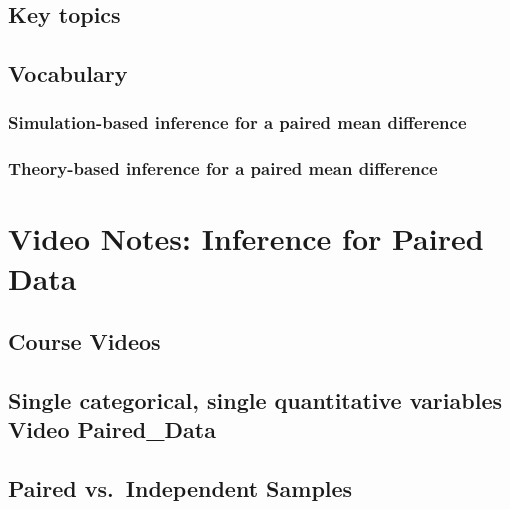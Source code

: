 \documentclass[
]{report}
\begin{document}
\subsection{Key topics}\label{key-topics-10}

\subsection{Vocabulary}\label{vocabulary-8}

\subsubsection*{Simulation-based inference for a paired mean difference}\label{simulation-based-inference-for-a-paired-mean-difference}

\subsubsection*{Theory-based inference for a paired mean difference}\label{theory-based-inference-for-a-paired-mean-difference}

\section{Video Notes: Inference for Paired Data}\label{video-notes-inference-for-paired-data}

\subsection{Course Videos}\label{course-videos-8}

\subsection*{Single categorical, single quantitative variables Video Paired\_Data}\label{single-categorical-single-quantitative-variables-video-paired_data}

\subsection*{Paired vs.~Independent Samples}\label{paired-vs.-independent-samples}
\end{document}
